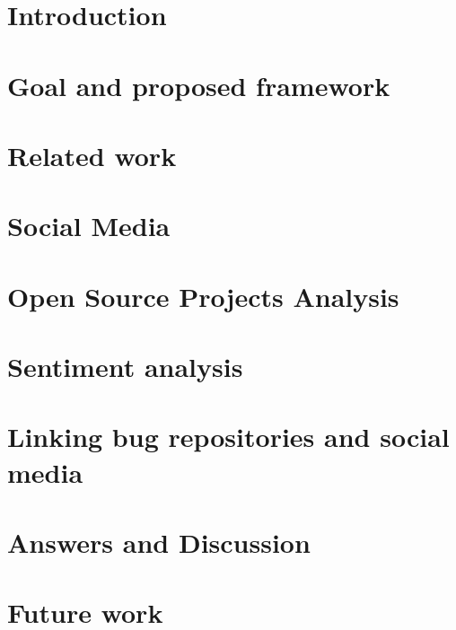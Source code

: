 \documentclass[a4paper,11pt,pdftex,halfparskip,cleardoubleempty]{report}
\begin{document}

\cleardoublepage

{\renewcommand{\addtocontents}[2]{}
\chapter*{}

}%

\tableofcontents 
\cleardoublepage
{}
\pagestyle{plain} 

\chapter{Introduction}
\label{chp:introduction}

 
\chapter{Goal and proposed framework}
\label{chap:proposedFramework}


\chapter{Related work}
\label{chap:relatedWork}


\chapter{Social Media}
\label{chap:socialMedia}



\chapter{Open Source Projects Analysis}
\label{chap:ossProjects}



\chapter{Sentiment analysis}
\label{chap:sentimentAnalysis}


\chapter{Linking bug repositories and social media}
\label{chap:pairingBugs}


\chapter{Answers and Discussion}
\label{chap:discussion}


\chapter{Future work}
\label{chap:futureWork}




\newpage
\nocite{*}


\end{document}
